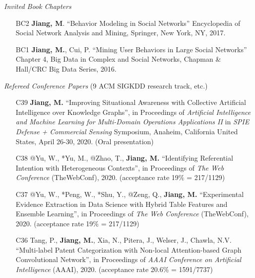 \documentclass[10pt]{article}
\newenvironment{myindentpar}[1]%
{\begin{list}{}%
         {\setlength{\leftmargin}{#1}}%
         \item[]%
}
{\end{list}}
\newcounter{list}
\begin{document}
\begin{myindentpar}{0.00cm}

\hspace{-0.25cm}\emph{Invited Book Chapters}

\begin{enumerate}[leftmargin=.5cm]

\item[BC2] \textbf{Jiang, M}. ``Behavior Modeling in Social Networks'' Encyclopedia of Social Network Analysis and Mining, Springer, New York, NY, 2017.
		
\item[BC1] \textbf{Jiang, M.}, Cui, P. ``Mining User Behaviors in Large Social Networks'' Chapter 4, Big Data in Complex and Social Networks, Chapman \& Hall/CRC Big Data Series, 2016.

\end{enumerate}

\hspace{-0.25cm}\emph{Refereed Conference Papers} {\small (9 ACM SIGKDD research track, etc.)}

\begin{enumerate}[leftmargin=.5cm]

\item[C39] \textbf{Jiang, M.} ``Improving Situational Awareness with Collective Artificial Intelligence over Knowledge Graphs'', in Proceedings of \textit{Artificial Intelligence and Machine Learning for Multi-Domain Operations Applications II} in \textit{SPIE Defense + Commercial Sensing} Symposium, Anaheim, California United States, April 26-30, 2020. (Oral presentation)

\item[C38] @Yu, W., *Yu, M., @Zhao, T., \textbf{Jiang, M.} ``Identifying Referential Intention with Heterogeneous Contexts'', in Proceedings of \textit{The Web Conference} (TheWebConf), 2020. (acceptance rate 19\% = 217/1129)

\item[C37] @Yu, W., *Peng, W., *Shu, Y., @Zeng, Q., \textbf{Jiang, M.} ``Experimental Evidence Extraction in Data Science with Hybrid Table Features and Ensemble Learning'', in Proceedings of \textit{The Web Conference} (TheWebConf), 2020. (acceptance rate 19\% = 217/1129)

\item[C36] Tang, P., \textbf{Jiang, M.}, Xia, N., Pitera, J., Welser, J., Chawla, N.V. ``Multi-label Patent Categorization with Non-local Attention-based Graph Convolutional Network'', in Proceedings of \textit{AAAI Conference on Artificial Intelligence} (AAAI), 2020. (acceptance rate 20.6\% = 1591/7737)
	

\end{enumerate}
\end{myindentpar}
\end{document}
